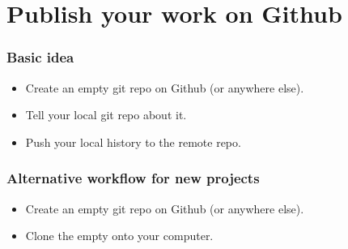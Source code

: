 \documentclass[12pt]{beamer}
\begin{document}


\section{Publish your work on Github}

\begin{frame}
  \frametitle{Basic idea}

  \begin{itemize}
    \item Create an empty git repo on Github (or anywhere else).
    \item Tell your local git repo about it.
    \item Push your local history to the remote repo.
  \end{itemize}
\end{frame}

\begin{frame}
  \frametitle{Alternative workflow for new projects}

  \begin{itemize}
    \item Create an empty git repo on Github (or anywhere else).
    \item Clone the empty onto your computer.
  \end{itemize}
\end{frame}




\end{document}
